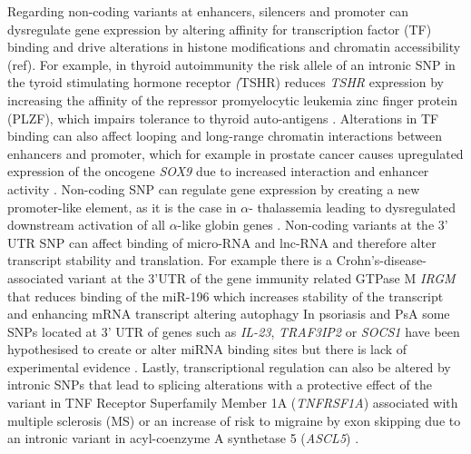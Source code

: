 Regarding non-coding variants at enhancers, silencers and promoter can dysregulate gene expression by altering affinity for transcription factor (TF) binding  and drive alterations in histone modifications and chromatin accessibility (ref). For example, in thyroid autoimmunity the risk allele of an intronic SNP in the tyroid stimulating hormone receptor \textit(TSHR) reduces \textit{TSHR} expression by increasing the affinity of the repressor promyelocytic leukemia zinc finger protein (PLZF), which impairs tolerance to thyroid auto-antigens \parencite{Stefan2014}. Alterations in TF binding can also affect looping and long-range chromatin interactions between enhancers and promoter, which for example in prostate cancer causes upregulated expression of the oncogene \textit{SOX9} due to increased interaction and enhancer activity \parencite{Zhang2012}. Non-coding SNP can regulate gene expression by creating a new promoter-like element, as it is the case in $\alpha$- thalassemia leading to  dysregulated downstream activation of all $\alpha$-like globin genes \parencite{Gobbi2006}. 
Non-coding variants at the 3' UTR SNP can affect binding of micro-RNA and lnc-RNA and therefore alter transcript stability and translation. For example  there is a Crohn’s-disease-associated variant at the 3'UTR of the gene immunity related GTPase M \textit{IRGM} that reduces binding of the miR-196 which increases stability of the transcript and enhancing mRNA transcript altering autophagy \parencite{Brest2011}
In psoriasis and PsA some SNPs located at 3' UTR of genes such as \textit{IL-23}, \textit{TRAF3IP2} or \textit{SOCS1} have been hypothesised to create or alter miRNA binding sites but there is lack of experimental evidence \parencite{Pivarcsi2014}. Lastly, transcriptional regulation can also be altered by intronic SNPs that lead to splicing alterations with a protective effect of the variant in TNF Receptor Superfamily Member 1A (\textit{TNFRSF1A}) associated with multiple sclerosis (MS) \parencite{Gregory2012} or an increase of risk to migraine by exon skipping due to an intronic variant in acyl-coenzyme A synthetase 5 (\textit{ASCL5}) \parencite{Matesanz2016}.

